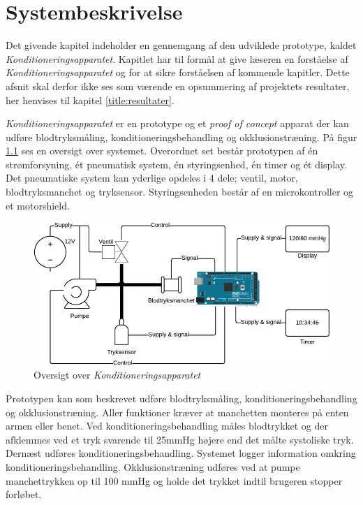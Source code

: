 \chapter{Systembeskrivelse}
Det givende kapitel indeholder en gennemgang af den udviklede prototype, kaldet \textit{Konditioneringsapparatet}. Kapitlet har til formål at give læseren en forståelse af \textit{Konditioneringsapparatet} og for at sikre forståelsen af kommende kapitler. Dette afsnit skal derfor ikke ses som værende en opsummering af projektets resultater, her henvises til kapitel \ref{title:resultater}.

\textit{Konditioneringsapparatet} er en prototype og et \textit{proof of concept} apparat der kan udføre blodtryksmåling, konditioneringsbehandling og okklusionstræning. På figur \ref{fig:systemTegning} ses en oversigt over systemet. Overordnet set består prototypen af én strømforsyning, ét pneumatisk system, én styringsenhed, én timer og ét display. Det pneumatiske system kan yderlige opdeles i 4 dele; ventil, motor, blodtryksmanchet og tryksensor. Styringsenheden består af en microkontroller og et motorshield. 

\begin{figure}[H]
	\centering
	\includegraphics[width = \textwidth]{billeder/systemDrawing-crop.pdf}
	\caption{Oversigt over \textit{Konditioneringsapparatet}} \label{fig:systemTegning}
\end{figure}

Prototypen kan som beskrevet udføre blodtryksmåling, konditioneringsbehandling og okklusionstræning. Aller funktioner kræver at manchetten monteres på enten armen eller benet. Ved konditioneringsbehandling måles blodtrykket og der afklemmes ved et tryk svarende til 25mmHg højere end det målte systoliske tryk. Dernæst udføres konditioneringsbehandling. Systemet logger information omkring konditioneringsbehandling. Okklusionstræning udføres ved at pumpe manchettrykken op til 100 mmHg og holde det trykket indtil brugeren stopper forløbet. 

